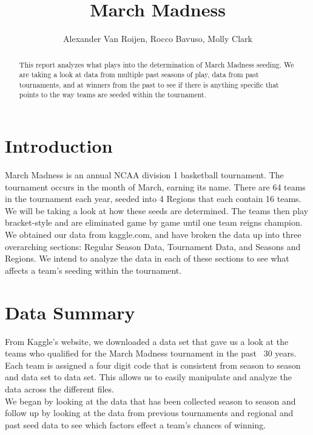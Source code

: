 \documentclass[]{scrartcl}
\title{March Madness}
\author{Alexander Van Roijen, Rocco Bavuso, Molly Clark}
\begin{document}
\maketitle

\begin{abstract}
\begin{center}
\noindent This report analyzes what plays into the determination of March Madness seeding. We are taking a look at data from multiple past seasons of play, data from past tournaments, and at winners from the past to see if there is anything specific that points to the way teams are seeded within the tournament.
\end{center}
\end{abstract}

\section*{Introduction}
March Madness is an annual NCAA division 1 basketball tournament. The tournament occurs in the month of March, earning its name. There are 64 teams in the tournament each year, seeded into 4 Regions that each contain 16 teams. We will be taking a look at how these seeds are determined. The teams then play bracket-style and are eliminated game by game until one team reigns champion.\\

\noindent
We obtained our data from kaggle.com, and have broken the data up into three overarching sections: Regular Season Data, Tournament Data, and Seasons and Regions. We intend to analyze the data in each of these sections to see what affects a team's seeding within the tournament.

\section*{Data Summary}
From Kaggle's website, we downloaded a data set that gave us a look at the teams who qualified for the March Madness tournament in the past ~30 years. Each team is assigned a four digit code that is consistent from season to season and data set to data set. This allows us to easily manipulate and analyze the data across the different files.\\

\noindent
We began by looking at the data that has been collected season to season and follow up by looking at the data from previous tournaments and regional and past seed data to see which factors effect a team's chances of winning.\\
\end{document}

